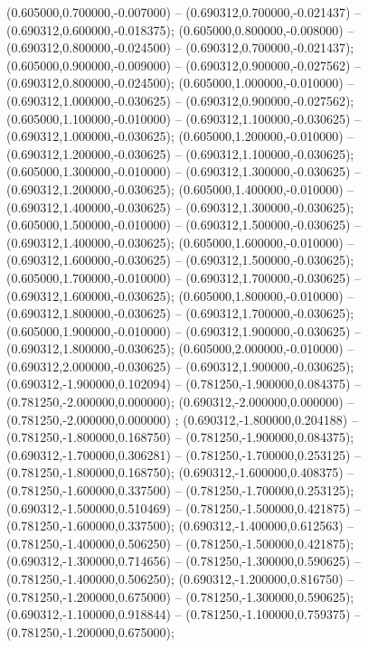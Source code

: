  (0.605000,0.700000,-0.007000) -- (0.690312,0.700000,-0.021437) -- (0.690312,0.600000,-0.018375);
 (0.605000,0.800000,-0.008000) -- (0.690312,0.800000,-0.024500) -- (0.690312,0.700000,-0.021437);
 (0.605000,0.900000,-0.009000) -- (0.690312,0.900000,-0.027562) -- (0.690312,0.800000,-0.024500);
 (0.605000,1.000000,-0.010000) -- (0.690312,1.000000,-0.030625) -- (0.690312,0.900000,-0.027562);
 (0.605000,1.100000,-0.010000) -- (0.690312,1.100000,-0.030625) -- (0.690312,1.000000,-0.030625);
 (0.605000,1.200000,-0.010000) -- (0.690312,1.200000,-0.030625) -- (0.690312,1.100000,-0.030625);
 (0.605000,1.300000,-0.010000) -- (0.690312,1.300000,-0.030625) -- (0.690312,1.200000,-0.030625);
 (0.605000,1.400000,-0.010000) -- (0.690312,1.400000,-0.030625) -- (0.690312,1.300000,-0.030625);
 (0.605000,1.500000,-0.010000) -- (0.690312,1.500000,-0.030625) -- (0.690312,1.400000,-0.030625);
 (0.605000,1.600000,-0.010000) -- (0.690312,1.600000,-0.030625) -- (0.690312,1.500000,-0.030625);
 (0.605000,1.700000,-0.010000) -- (0.690312,1.700000,-0.030625) -- (0.690312,1.600000,-0.030625);
 (0.605000,1.800000,-0.010000) -- (0.690312,1.800000,-0.030625) -- (0.690312,1.700000,-0.030625);
 (0.605000,1.900000,-0.010000) -- (0.690312,1.900000,-0.030625) -- (0.690312,1.800000,-0.030625);
 (0.605000,2.000000,-0.010000) -- (0.690312,2.000000,-0.030625) -- (0.690312,1.900000,-0.030625);
 (0.690312,-1.900000,0.102094) -- (0.781250,-1.900000,0.084375) -- (0.781250,-2.000000,0.000000);
 (0.690312,-2.000000,0.000000) -- (0.781250,-2.000000,0.000000) ;
 (0.690312,-1.800000,0.204188) -- (0.781250,-1.800000,0.168750) -- (0.781250,-1.900000,0.084375);
 (0.690312,-1.700000,0.306281) -- (0.781250,-1.700000,0.253125) -- (0.781250,-1.800000,0.168750);
 (0.690312,-1.600000,0.408375) -- (0.781250,-1.600000,0.337500) -- (0.781250,-1.700000,0.253125);
 (0.690312,-1.500000,0.510469) -- (0.781250,-1.500000,0.421875) -- (0.781250,-1.600000,0.337500);
 (0.690312,-1.400000,0.612563) -- (0.781250,-1.400000,0.506250) -- (0.781250,-1.500000,0.421875);
 (0.690312,-1.300000,0.714656) -- (0.781250,-1.300000,0.590625) -- (0.781250,-1.400000,0.506250);
 (0.690312,-1.200000,0.816750) -- (0.781250,-1.200000,0.675000) -- (0.781250,-1.300000,0.590625);
 (0.690312,-1.100000,0.918844) -- (0.781250,-1.100000,0.759375) -- (0.781250,-1.200000,0.675000);
